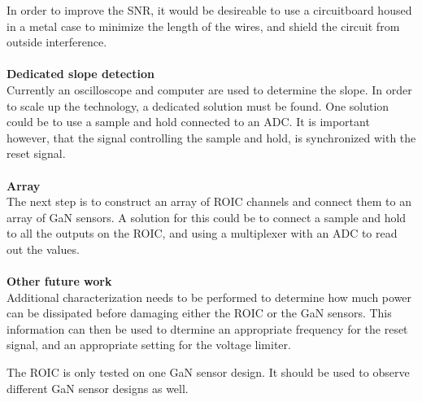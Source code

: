 In order to improve the SNR, it would be desireable to use a circuitboard housed in a metal case to minimize the length of the wires, and shield the circuit from outside interference.\\
\\
\textbf{Dedicated slope detection}\\
Currently an oscilloscope and computer are used to determine the slope. In order to scale up the technology, a dedicated solution must be found. One solution could be to use a sample and hold connected to an ADC. It is important however, that the signal controlling the sample and hold, is synchronized with the reset signal. \\
\\
\textbf{Array}\\
The next step is to construct an array of ROIC channels and connect them to an array of GaN sensors. A solution for this could be to connect a sample and hold to all the outputs on the ROIC, and using a multiplexer with an ADC to read out the values. \\
\\
\textbf{Other future work}\\
Additional characterization needs to be performed to determine how much power can be dissipated before damaging either the ROIC or the GaN sensors. This information can then be used to dtermine an appropriate frequency for the reset signal, and an appropriate setting for the voltage limiter.

The ROIC is only tested on one GaN sensor design. It should be used to observe different GaN sensor designs as well.


